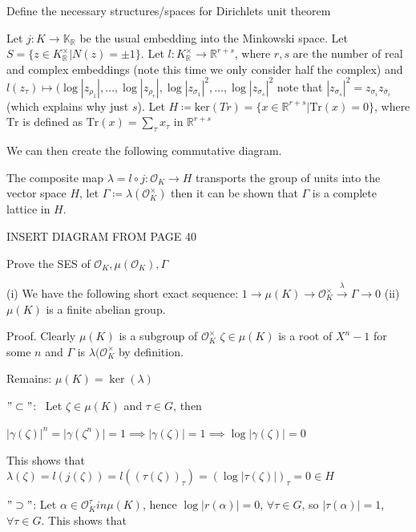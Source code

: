 Define the necessary structures/spaces for Dirichlets unit theorem


Let \( j : K \to \mathbb{K}_\mathbb{R} \) be the usual embedding into the Minkowski space.
Let \( S = \{z \in K^{\times}_{\mathbb{R}}|N(z) = \pm 1 \} \).
Let \( l : K^{\times}_{\mathbb{R}} \to \mathbb{R}^{r + s} \), where \( r,s \) are the number of real 
and complex embeddings (note this time we only consider half the complex)
and \( l(z_\tau) \mapsto (\log|z_{\rho_1}|, \dots, \log|z_{\rho_r}|, \log|z_{\sigma_1}|^2, \dots, \log|z_{\sigma_s}|^2\)
note that \(|z_{\sigma_s}|^2 = z_{\sigma_i}z_{\bar{\sigma}_i}\) (which explains why just \( s \)).
Let \( H \coloneqq \text{ker}(Tr) = \{ x \in \mathbb{R}^{r+s}| \text{Tr}(x) = 0\} \),
where \( \text{Tr} \) is defined as \( \text{Tr}(x) = \sum_{\tau} x_\tau \) in \(\mathbb{R}^{r + s}\)

We can then create the following commutative diagram.

The composite map \( \lambda = l \circ j : \mathcal{O}_K \to H \)
transports the group of units into the vector space \( H \), let \( \Gamma \coloneqq \lambda(\mathcal{O}^{\times}_K) \)
then it can be shown that \( \Gamma \) is a complete lattice in \( H \).

INSERT DIAGRAM FROM PAGE 40


Prove the SES of \( \mathcal{O}_K, \mu(\mathcal{O}_K), \Gamma \)

(i) We have the following short exact sequence:
\( 1 \longrightarrow \mu(K) \longrightarrow \mathcal{O}^{\times}_K \xrightarrow{\lambda} \Gamma \to 0 \)
(ii) \(\mu(K)\) is a finite abelian group.

Proof.  Clearly \(\mu(K)\) is a subgroup of \(\mathcal{O}_K^{\times}\) \(\zeta \in \mu(K)\) is a root of \(X^n - 1\) for some \(n\)
and \(\Gamma\) is \(\lambda(\mathcal{O}_K^\times\) by definition.

Remains: \(\mu(K) = \ker(\lambda)\)

\("\subset"\): \ Let \(\zeta \in \mu(K)\) and \(\tau \in G\), then

\( \vert \gamma(\zeta) \vert^n = \vert \gamma(\zeta^n) \vert = 1 \implies \vert \gamma(\zeta) \vert = 1 \implies \log \vert \gamma(\zeta) \vert = 0 \)

This shows that \(\lambda(\zeta) = l(j(\zeta)) = l((\tau(\zeta))_\tau) = \left( \log \vert \tau(\zeta) \vert \right)_\tau = 0 \in H\)

\("\supset"\): Let \(\alpha \in \mathcal{O}_K^\tau in \mu(K)\), hence \(\log \vert r(\alpha) \vert = 0\), \(\forall \tau \in G\), so 
\(\vert \tau(\alpha) \vert = 1\), \( \forall \tau \in G\).
This shows that

